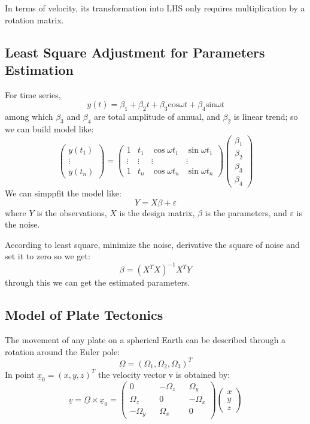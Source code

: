\documentclass{article}
\begin{document}
In terms of velocity, its transformation into LHS only requires multiplication by a rotation matrix.
\subsection{Least Square Adjustment for Parameters Estimation}
For time series, $$ y(t)=\beta_{1}+\beta_{2}t+\beta_{3}\mathrm{cos}\omega t+\beta_{4}\mathrm{sin}\omega t $$
among which $\beta_3$ and $\beta_4$ are total amplitude of annual, and $\beta_2$ is linear trend; so we can build model like:
$$\begin{pmatrix}y(t_1)\\\vdots\\y(t_n)\end{pmatrix}=\begin{pmatrix}1&t_1&\cos\omega t_1&\sin\omega t_1\\\vdots&\vdots&\vdots&\vdots\\1&t_n&\cos\omega t_n&\sin\omega t_n\end{pmatrix}\begin{pmatrix}\beta_1\\\beta_2\\\beta_3\\\beta_4\end{pmatrix}$$
We can simppfit the model like: $$Y=X\beta+\varepsilon$$
where $Y$ is the observations, $X$ is the design matrix, $\beta$ is the parameters, and $\varepsilon$ is the noise.

According to least square, minimize the noise, 
derivative the square of noise and set it to zero so we get:
$$\beta=(X^TX)^{-1}X^TY$$ through this we can get the estimated parameters.

\subsection{Model of Plate Tectonics}
The movement of any plate on a spherical Earth can be described through a rotation around the Euler pole:
$$\underline{\Omega}=(\Omega_{1},\Omega_{2},\Omega_{3})^{T}$$
In point $\underline{x}_{0}=(x,y,z)^{T}$ the velocity vector v is obtained by:
$$\underline{v}=\underline{\Omega}\times\underline{x}_0=\begin{pmatrix}0&&-\Omega_z&&\Omega_y\\\Omega_z&&0&&-\Omega_x\\-\Omega_y&&\Omega_x&&0\end{pmatrix}\begin{pmatrix}x\\y\\z\end{pmatrix}$$
\end{document}
